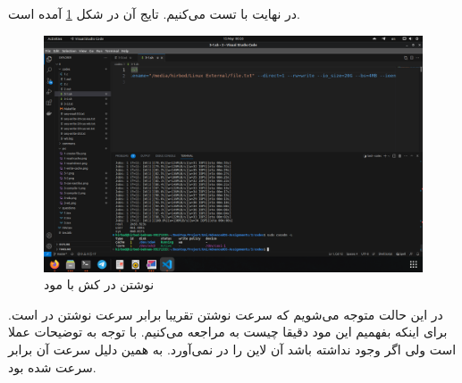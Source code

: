 در نهایت با
تست می‌کنیم.
تایج آن در شکل
\ref{fig:3-4-wa}
آمده است.
\begin{figure}[H]
    \centering
    \includegraphics[scale=0.25]{pic/3-wa.png}
    \caption{نوشتن در کش با مود }
    \label{fig:3-4-wa}
\end{figure}
در این حالت متوجه می‌شویم که سرعت نوشتن تقریبا برابر سرعت نوشتن در
است. برای اینکه بفهمیم این مود دقیقا چیست به
مراجعه می‌کنیم. با توجه به توضیحات عملا
است ولی اگر
وجود نداشته باشد آن لاین را در
نمی‌آورد. به همین دلیل سرعت آن برابر سرعت
شده بود.